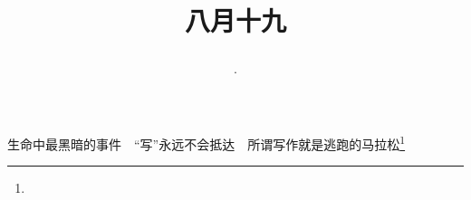 \title{\date[d=21,m=9,y=2024][year:cn-y,年,month:cn,day:cn,日,·,weekday]·八月十九 }
生命中最黑暗的事件　“写”永远不会抵达　所谓写作就是逃跑的马拉松\footnote{ }

